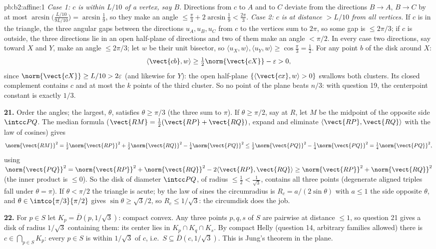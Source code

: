 \begin{solution}{pb:b2:affine:1}
\emph{Case 1: $c$ is within $L/10$ of a vertex, say $B$.}
Directions from $c$ to $A$ and to $C$ deviate from the
directions $B \to A$, $B \to C$ by at most
$\arcsin\bigl(\tfrac{L/10}{9L/10}\bigr) = \arcsin\tfrac19$,
so they make an angle $\leq \tfrac\pi3 + 2\arcsin\tfrac19 <
\tfrac{2\pi}3$. \emph{Case 2: $c$ is at distance $> L/10$
from all vertices.} If $c$ is in the triangle, the three
angular gaps between the directions $u_A, u_B, u_C$ from $c$
to the vertices sum to $2\pi$, so some gap is $\leq 2\pi/3$;
if $c$ is outside, the three directions lie in an open
half-plane of directions and two of them make an angle $<
\pi/2$. In every case two directions, say toward $X$ and $Y$,
make an angle $\leq 2\pi/3$; let $w$ be their unit bisector,
so $\langle u_X, w\rangle, \langle u_Y, w\rangle \geq
\cos\tfrac\pi3 = \tfrac12$. For any point $b$ of the disk
around $X$:
\[
\langle \vect{cb}, w\rangle \geq
\tfrac12\norm{\vect{cX}} - \varepsilon > 0,
\]
since $\norm{\vect{cX}} \geq L/10 > 2\varepsilon$ (and
likewise for $Y$): the open half-plane $\{\langle \vect{cx},
w\rangle > 0\}$ swallows both clusters. Its closed
complement contains $c$ and at most the $k$ points of the
third cluster. So no point of the plane beats $n/3$: with
question 19, the centerpoint constant is exactly $1/3$.

\textbf{21.} Order the angles; the largest, $\theta$,
satisfies $\theta \geq \pi/3$ (the three sum to $\pi$). If
$\theta \geq \pi/2$, say at $R$, let $M$ be the midpoint of
the opposite side $\intcc PQ$. The median formula ($\vect{RM}
= \tfrac12(\vect{RP} + \vect{RQ})$, expand and eliminate
$\langle\vect{RP}, \vect{RQ}\rangle$ with the law of
cosines) gives
\[
\norm{\vect{RM}}^2 = \tfrac12\norm{\vect{RP}}^2 +
\tfrac12\norm{\vect{RQ}}^2 - \tfrac14\norm{\vect{PQ}}^2 \leq
\tfrac12\norm{\vect{PQ}}^2 - \tfrac14\norm{\vect{PQ}}^2 =
\tfrac14\norm{\vect{PQ}}^2,
\]
using $\norm{\vect{PQ}}^2 = \norm{\vect{RP}}^2 +
\norm{\vect{RQ}}^2 - 2\langle\vect{RP}, \vect{RQ}\rangle \geq
\norm{\vect{RP}}^2 + \norm{\vect{RQ}}^2$ (the inner product
is $\leq 0$). So the disk of diameter $\intcc PQ$, of radius
$\leq \tfrac12 < \tfrac1{\sqrt3}$, contains all three points
(degenerate aligned triples fall under $\theta = \pi$). If
$\theta < \pi/2$ the triangle is acute; by the law of sines
the circumradius is $R_c = a/(2\sin\theta)$ with $a \leq 1$
the side opposite $\theta$, and $\theta \in
\intco{\pi/3}{\pi/2}$ gives $\sin\theta \geq \sqrt3/2$, so
$R_c \leq 1/\sqrt3$: the circumdisk does the job.

\textbf{22.} For $p \in S$ let $K_p = \overline D(p,
1/\sqrt3)$: compact convex. Any three points $p, q, s$ of $S$
are pairwise at distance $\leq 1$, so question 21 gives a
disk of radius $1/\sqrt3$ containing them: its center lies in
$K_p \cap K_q \cap K_s$. By compact Helly (question 14,
arbitrary families allowed) there is $c \in \bigcap_{p\in
S}K_p$: every $p \in S$ is within $1/\sqrt3$ of $c$, i.e.\ $S
\subseteq \overline D(c, 1/\sqrt3)$. This is Jung's theorem
in the plane.


\end{solution}
